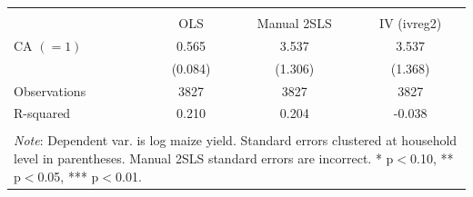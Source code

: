\begin{tabular}{l*{3}{c}} 
\\[-1.8ex]\hline \hline \\[-1.8ex] 
& \multicolumn{1}{c}{OLS} & 
\multicolumn{1}{c}{Manual 2SLS} & 
\multicolumn{1}{c}{IV (ivreg2)} 
\\ \midrule
\midrule
\hspace{0.1cm} CA $(=1)$&       0.565\sym{***}&       3.537\sym{***}&       3.537\sym{***}\\
                    &     (0.084)         &     (1.306)         &     (1.368)         \\
\midrule
Observations        &        3827         &        3827         &        3827         \\
R-squared           &       0.210         &       0.204         &      -0.038         \\
\hline \hline \\[-1.8ex] 
\multicolumn{4}{p{\linewidth}}{\small 
\noindent \textit{Note}: Dependent var. 
is log maize yield. Standard errors 
clustered at household level in 
parentheses. Manual 2SLS standard errors 
are incorrect. 
* p$<$0.10, ** p$<$0.05, *** p$<$0.01.} 
\end{tabular}

